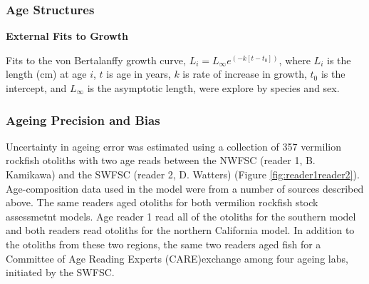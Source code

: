 \documentclass[11pt,
  english,
  a4paper,
]{article}
\begin{document}

\hypertarget{age-structures}{%
\subsubsection{Age Structures}\label{age-structures}}

\leavevmode\tagmcend\tagstructend

\textbf{External Fits to Growth}

Fits to the von Bertalanffy growth curve, {\(L_i = L_{\infty}e^{(-k[t-t_0])}\)\leavevmode\tagmcend\tagstructend}, where {\(L_i\)\leavevmode\tagmcend\tagstructend} is the length (cm) at age {\(i\)\leavevmode\tagmcend\tagstructend}, {\(t\)\leavevmode\tagmcend\tagstructend} is age in years, {\(k\)\leavevmode\tagmcend\tagstructend} is rate of increase in growth, {\(t_0\)\leavevmode\tagmcend\tagstructend} is the intercept, and {\(L_{\infty}\)\leavevmode\tagmcend\tagstructend} is the asymptotic length, were explore by species and sex.


\hypertarget{ageing-precision-and-bias}{%
\subsubsection{Ageing Precision and Bias}\label{ageing-precision-and-bias}}

\leavevmode\tagmcend\tagstructend

Uncertainty in ageing error was estimated using a collection of 357 vermilion rockfish otoliths with two age reads between the NWFSC (reader 1, B. Kamikawa) and the SWFSC (reader 2, D. Watters) (Figure \ref{fig:reader1reader2}). Age-composition data used in the model were from a number of sources described above. The same readers aged otoliths for both vermilion rockfish stock assessmetnt models. Age reader 1 read all of the otoliths for the southern model and both readers read otoliths for the northern California model. In addition to the otoliths from these two regions, the same two readers aged fish for a Committee of Age Reading Experts (CARE)exchange among four ageing labs, initiated by the SWFSC.
\end{document}
